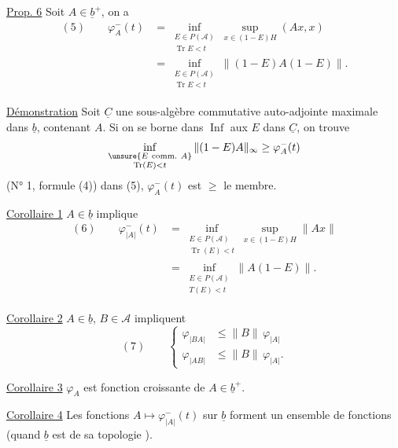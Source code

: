 
\uline{Prop. 6} Soit $A\in\underline b^+$, on a
\[
\begin{aligned}
(5)\qquad \varphi_A^-(t)
 &=\inf_{\substack{E\in P(\mathcal A)\\ \operatorname{Tr}E<t}}
       \sup_{x\in(1-E)H}(Ax,x)\\
 &=\inf_{\substack{E\in P(\mathcal A)\\ \operatorname{Tr}E<t}}
       \|(1-E)A(1-E)\|.
\end{aligned}
\]

\uline{Démonstration} Soit $\underline C$  une sous-algèbre commutative auto-adjointe maximale dans $\underline b$, contenant $A$. Si on se borne dans  $\operatorname{Inf}$ aux $E$  dans $\underline C$, on trouve
\[
\inf_{\substack{\unsure{E\mathrm{\ comm.\ }A}\\ \operatorname{Tr}(E)<t}}
\|(1-E)A\|_\infty\geq\varphi_A^-(t)
\]
\margin{$\unsure{\Downarrow}$}
(N° 1, formule (4))  dans (5), $\varphi_A^-(t)$ est $\geq$ le  membre.

\uline{Corollaire 1} $A\in\underline b$ implique
\[
\begin{aligned}
(6)\qquad \varphi_{|A|}^-(t)
 &=\inf_{\substack{E\in P(\mathcal A)\\ \operatorname{Tr}(E)<t}}
       \sup_{x\in(1-E)H}\|Ax\|\\
 &=\inf_{\substack{E\in P(\mathcal A)\\ T(E)<t}}\|A(1-E)\|.
\end{aligned}
\]

\uline{Corollaire 2} $A\in\underline b$, $B\in\mathcal A$ impliquent
\[
(7)\qquad
\left\{\begin{aligned}
\varphi_{|BA|}&\leq\|B\|\,\varphi_{|A|}\\
\varphi_{|AB|}&\leq\|B\|\,\varphi_{|A|}.
\end{aligned}\right.
\]

\uline{Corollaire 3} $\varphi_A$ est fonction croissante de $A\in\underline b^+$.

\uline{Corollaire 4} Les fonctions $A\longmapsto\varphi_{|A|}^-(t)$ sur $\underline b$ forment un ensemble  de fonctions (quand $\underline b$ est  de sa topologie ).
\margin{$\Big|$}


